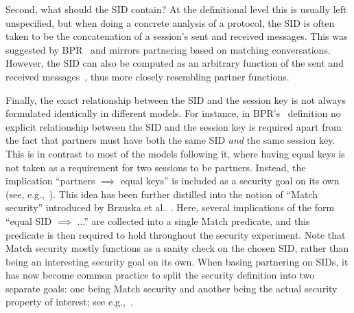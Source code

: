Second,
what should the SID contain?
At the definitional level this is usually left unspecified,
but when doing a concrete analysis of a protocol,
the SID is often taken to be the concatenation of a session's sent and received messages.
This was suggested by BPR~\cite{EC:BelPoiRog00} and mirrors partnering based on matching conversations.
However,
the SID can also be computed as an arbitrary function of the sent and received messages~\cite{PKC:AbdFouPoi05},
thus more closely resembling partner functions.

Finally,
the exact relationship between the SID and the session key is not always formulated identically in different models.
For instance,
in BPR's~\cite{EC:BelPoiRog00} definition no explicit relationship between the SID and the session key is required apart from the fact that partners must have both the same SID \emph{and} the same session key.
This is in contrast to most  of the models following it,
where having equal keys is not taken as a requirement for two sessions to be partners.
Instead,
the implication ``partners $\implies$ equal keys'' is included as a security goal on its own 
(see, e.g.,~\cite{EC:CanKra01,C:CanKra02,PROVSEC:LaMLauMit07,ESORICS:CreFel12}).
This idea has been further distilled into the notion of ``\textsf{Match} security'' introduced by Brzuska et al.~\cite{CCS:BFWW11}.
Here, several implications of the form ``equal SID $\implies$ ...'' are collected into a single \textsf{Match} predicate,
and this predicate is then required to hold throughout the security experiment.
Note that \textsf{Match} security mostly functions as a sanity check on the chosen SID,
rather than being an interesting security goal on its own.
When basing partnering on SIDs,
it has now become common practice to split the security definition into two separate goals:
one being \textsf{Match} security and another being the  actual security property of interest; see e.g.,~\cite{CCS:BFWW11,BrzuskaFSWW:2012:less_is_more,CCS:FisGue14,CCS:DFGS15}. 


